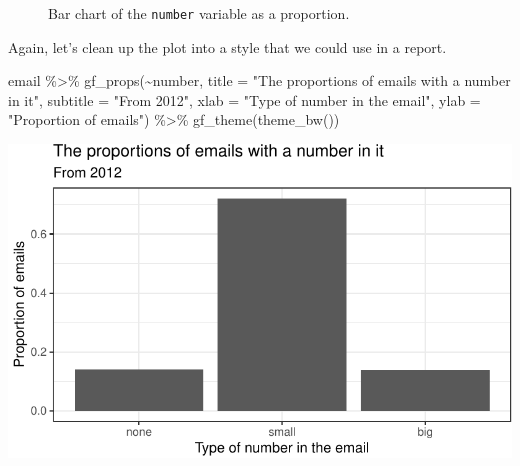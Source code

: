 \documentclass[
  letterpaper,
  DIV=11,
  numbers=noendperiod]{scrreprt}
\newenvironment{Shaded}{\begin{snugshade}}{\end{snugshade}}
\newcommand{\AttributeTok}[1]{\textcolor[rgb]{0.40,0.45,0.13}{#1}}
\newcommand{\FunctionTok}[1]{\textcolor[rgb]{0.28,0.35,0.67}{#1}}
\newcommand{\NormalTok}[1]{\textcolor[rgb]{0.00,0.23,0.31}{#1}}
\newcommand{\SpecialCharTok}[1]{\textcolor[rgb]{0.37,0.37,0.37}{#1}}
\newcommand{\StringTok}[1]{\textcolor[rgb]{0.13,0.47,0.30}{#1}}
\begin{document}
\begin{figure}[H]


\caption{\label{fig-bar62}Bar chart of the \texttt{number} variable as a
proportion.}

\end{figure}%

Again, let's clean up the plot into a style that we could use in a
report.

\begin{Shaded}
\begin{Highlighting}[]
\NormalTok{email }\SpecialCharTok{\%\textgreater{}\%}
  \FunctionTok{gf\_props}\NormalTok{(}\SpecialCharTok{\textasciitilde{}}\NormalTok{number, }
           \AttributeTok{title =} \StringTok{"The proportions of emails with a number in it"}\NormalTok{,}
           \AttributeTok{subtitle =} \StringTok{"From 2012"}\NormalTok{, }\AttributeTok{xlab =} \StringTok{"Type of number in the email"}\NormalTok{,}
           \AttributeTok{ylab =} \StringTok{"Proportion of emails"}\NormalTok{) }\SpecialCharTok{\%\textgreater{}\%}
  \FunctionTok{gf\_theme}\NormalTok{(}\FunctionTok{theme\_bw}\NormalTok{())}
\end{Highlighting}
\end{Shaded}

\includegraphics{06-Categorical-Data_files/figure-pdf/unnamed-chunk-16-1.pdf}
\end{document}
